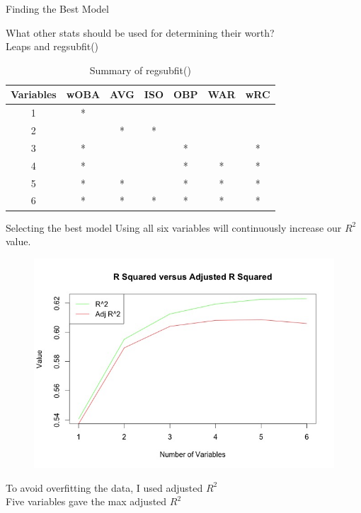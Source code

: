 \documentclass{beamer}
\begin{document}
\begin{frame}{Finding the Best Model}
\begin{block}

What other stats should be used for determining their worth?\\
Leaps and regsubfit()\\
\begin{table}[]
\centering
\caption{Summary of regsubfit()}
\label{my-label}
\begin{tabular}{|c|c|c|c|c|c|c|}
\hline
Variables & wOBA & AVG & ISO & OBP & WAR & wRC \\ \hline
1         & *    &     &     &     &     &     \\ \hline
2         &      & *   & *   &     &     &     \\ \hline
3         & *    &     &     & *   &     & *   \\ \hline
4         & *    &     &     & *   & *   & *   \\ \hline
5         & *    & *   &     & *   & *   & *   \\ \hline
6         & *    & *   & *   & *   & *   & *   \\ \hline
\end{tabular}
\end{table}

\end{block}
\end{frame}


\begin{frame}{Selecting the best model}
Using all six variables will continuously increase our $R^2$ value.\\

\begin{figure}
\includegraphics[width=3.3 in]{RvsadjR.jpeg}
\end{figure}

To avoid overfitting the data, I used adjusted $R^2$\\
Five variables gave the max adjusted $R^2$\\
\end{frame}
\end{document}
